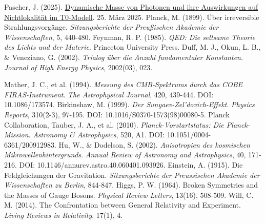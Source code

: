 \documentclass[12pt,a4paper]{article}
\begin{document}
\begin{thebibliography}{99}
		 Pascher, J. (2025). \href{https://github.com/jpascher/T0-Time-Mass-Duality/tree/main/2/pdf/Deutsch/DynMassePhotonenNichtlokal.pdf}{Dynamische Masse von Photonen und ihre Auswirkungen auf Nichtlokalität im T0-Modell}. 25. März 2025.
		 Planck, M. (1899). Über irreversible Strahlungsvorgänge. \textit{Sitzungsberichte der Preußischen Akademie der Wissenschaften}, 5, 440-480.
		 Feynman, R. P. (1985). \textit{QED: Die seltsame Theorie des Lichts und der Materie}. Princeton University Press.
		 Duff, M. J., Okun, L. B., \& Veneziano, G. (2002). \textit{Trialog über die Anzahl fundamentaler Konstanten}. \textit{Journal of High Energy Physics}, 2002(03), 023.
		
		
		 Mather, J. C., et al. (1994). \textit{Messung des CMB-Spektrums durch das COBE FIRAS-Instrument}. \textit{The Astrophysical Journal}, 420, 439-444. DOI: 10.1086/173574.
		 Birkinshaw, M. (1999). \textit{Der Sunyaev-Zel'dovich-Effekt}. \textit{Physics Reports}, 310(2-3), 97-195. DOI: 10.1016/S0370-1573(98)00080-5.
		 Planck Collaboration, Tauber, J. A., et al. (2010). \textit{Planck-Vorstartstatus: Die Planck-Mission}. \textit{Astronomy \& Astrophysics}, 520, A1. DOI: 10.1051/0004-6361/200912983.
		 Hu, W., \& Dodelson, S. (2002). \textit{Anisotropien des kosmischen Mikrowellenhintergrunds}. \textit{Annual Review of Astronomy and Astrophysics}, 40, 171-216. DOI: 10.1146/annurev.astro.40.060401.093926.
		 Einstein, A. (1915). Die Feldgleichungen der Gravitation. \textit{Sitzungsberichte der Preussischen Akademie der Wissenschaften zu Berlin}, 844-847.
		 Higgs, P. W. (1964). Broken Symmetries and the Masses of Gauge Bosons. \textit{Physical Review Letters}, 13(16), 508-509.
		 Will, C. M. (2014). The Confrontation between General Relativity and Experiment. \textit{Living Reviews in Relativity}, 17(1), 4.
	\end{thebibliography}
	
\end{document}
